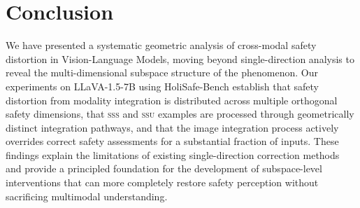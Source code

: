\documentclass{article}
\newcommand{\ssu}{\textsc{ssu}}
\newcommand{\sss}{\textsc{sss}}
\begin{document}
\section{Conclusion}
\label{sec:conclusion}

We have presented a systematic geometric analysis of cross-modal safety distortion
in Vision-Language Models, moving beyond single-direction analysis to reveal the
multi-dimensional subspace structure of the phenomenon.  Our experiments on
LLaVA-1.5-7B using HoliSafe-Bench establish that safety distortion from modality
integration is distributed across multiple orthogonal safety dimensions, that
\sss{} and \ssu{} examples are processed through geometrically distinct
integration pathways, and that the image integration process actively overrides
correct safety assessments for a substantial fraction of inputs.  These findings
explain the limitations of existing single-direction correction methods and
provide a principled foundation for the development of subspace-level
interventions that can more completely restore safety perception without
sacrificing multimodal understanding.


% 
\end{document}

